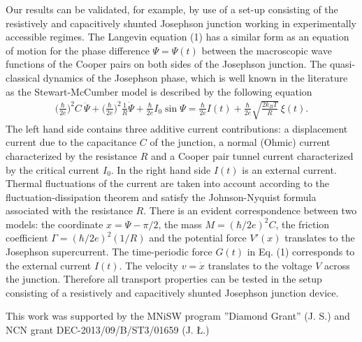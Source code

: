 \documentclass[12pt]{iopart}
\begin{document}
Our results can be validated, for example, by use of a set-up consisting of the resistively and capacitively shunted Josephson junction working in experimentally accessible regimes. The Langevin equation (1) has a similar form  
as an equation of motion for the phase difference $\Psi=\Psi(t)$  between the macroscopic wave functions of the
Cooper pairs on both sides of the Josephson junction. The quasi-classical dynamics of the Josephson phase, which is well known in the literature as the Stewart-McCumber model \cite{kautz1996,stewart,mccumber} is described by the following equation
%
\begin{eqnarray} \label{JJ1}
\Big( \frac{\hbar}{2e} \Big)^2 C\:\ddot{\Psi} + \Big( \frac{\hbar}{2e} \Big)^2 \frac{1}{R} \dot{\Psi}
+ \frac{\hbar}{2e} I_0 \sin \Psi  = \frac{\hbar}{2e} I(t) + \frac{\hbar}{2e}
\sqrt{\frac{2 k_B T}{R}} \:\xi (t) .
\end{eqnarray}
%
The left hand side contains three additive current contributions: a displacement current due to the capacitance $C$ of the junction, a normal (Ohmic) current characterized by the resistance $R$ and a Cooper pair tunnel current characterized by the critical current $I_0$. In the right hand side $I(t)$ is an external current. Thermal fluctuations of the current are taken into account according to the fluctuation-dissipation theorem and satisfy the Johnson-Nyquist formula associated with the resistance $R$. There is an evident correspondence between two models: the coordinate $x=\Psi -\pi/2$, the mass $M=(\hbar /2e)^2 C$, the friction coefficient $\Gamma = (\hbar/2 e)^2(1/R)$ and the potential force $V'(x)$ translates to the Josephson supercurrent. The time-periodic force $G(t)$ in Eq. (1) corresponds to the external current $I(t)$. The velocity $v=\dot x$ translates to the voltage $V$ across the junction. Therefore all transport properties can be tested in the setup consisting of a resistively and capacitively shunted Josephson junction device.

\ack
This work was supported by the MNiSW program ”Diamond Grant” (J. S.) and NCN grant DEC-2013/09/B/ST3/01659 (J. {\L}.)
\end{document}
